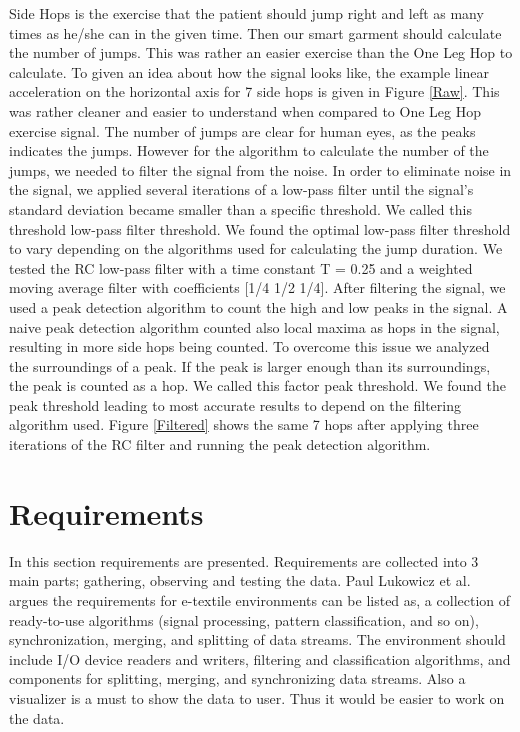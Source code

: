 Side Hops is the exercise that the patient should jump right and left as many times as he/she can in the given time. Then our smart garment should calculate the number of jumps. This was rather an easier exercise than the One Leg Hop to calculate. To given an idea about how the signal looks like, the example linear acceleration on the horizontal axis for 7 side hops is given in Figure \ref{Raw}. This was rather cleaner and easier to understand when compared to One Leg Hop exercise signal. The number of jumps are clear for human eyes, as the peaks indicates the jumps. However for the algorithm to calculate the number of the jumps, we needed to filter the signal from the noise. In order to eliminate noise in the signal, we applied several iterations of a low-pass filter until the signal's standard deviation became smaller than a specific threshold. We called this threshold low-pass filter threshold. We found the optimal low-pass filter threshold to vary depending on the algorithms used for calculating the jump duration. We tested the RC low-pass filter with a time constant T = 0.25 and a weighted moving average filter with coefficients [1/4 1/2 1/4]. After filtering the signal, we used a peak detection algorithm to count the high and low peaks in the signal. A naive peak detection algorithm counted also local maxima as hops in the signal, resulting in more side hops being counted. To overcome this issue we analyzed the surroundings of a peak. If the peak is larger enough than its surroundings, the peak is counted as a hop. We called this factor peak threshold. We found the peak threshold leading to most accurate results to depend on the filtering algorithm used. Figure \ref{Filtered} shows the same 7 hops after applying three iterations of the RC filter and running the peak detection algorithm.




\section{Requirements}
			
In this section requirements are presented. Requirements are collected into 3 main parts; gathering, observing and testing the data. Paul Lukowicz et al. argues the requirements for e-textile environments can be listed as, a collection of ready-to-use algorithms (signal processing, pattern classification, and so on), synchronization, merging, and splitting of data streams. The environment should include I/O device readers and writers, filtering and classification algorithms, and components for splitting, merging, and synchronizing data streams. Also a visualizer is a must to show the data to user. Thus it would be easier to work on the data. 

